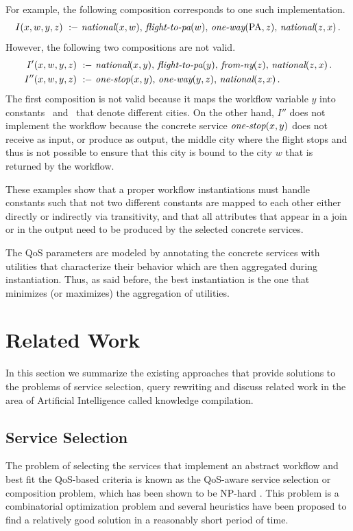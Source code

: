 \documentclass{llncs}
\newcommand{\qrule}{:\!\!-}
\newcommand{\national}{\text{\it national}}
\newcommand{\oneway}{\text{\it one-way}}
\newcommand{\onestop}{\text{\it one-stop}}
\newcommand{\flightPA}{\text{\it flight-to-pa}}
\newcommand{\fromNY}{\text{\it from-ny}}
\newcommand{\PA}{\text{PA}}
\newcommand{\NY}{\text{NY}}
\begin{document}
For example, the following composition corresponds to one such implementation.
\[ I(x,w,y,z)\ \qrule\ \national(x,w),\,\flightPA(w),\,\oneway(\PA,z),\,\national(z,x)\,. \]
However, the following two compositions are not valid.
\begin{alignat*}{1}
I'(x,w,y,z)\  \qrule\ &\national(x,y),\,\flightPA(y),\,\fromNY(z),\,\national(z,x)\,. \\
I''(x,w,y,z)\ \qrule\ &\onestop(x,y),\,\oneway(y,z),\,\national(z,x)\,.
\end{alignat*}
The first composition is not valid because it maps the workflow variable $y$
into constants \PA\ and \NY\ that denote different cities.
On the other hand, $I''$ does not implement the workflow because the concrete
service $\onestop(x,y)$ does not receive as input, or produce as output, the
middle city where the flight stops and thus is not possible to ensure that 
this city is bound to the city $w$ that is returned by the workflow.

These examples show that a proper workflow instantiations must handle
constants such that not two different constants are mapped to each
other either directly or indirectly via transitivity, and that all
attributes that appear in a join or in the output need to be produced
by the selected concrete services.

The QoS parameters are modeled by annotating the concrete services with
utilities that characterize their behavior which are then aggregated
during instantiation. Thus, as said before, the best instantiation is
the one that minimizes (or maximizes) the aggregation of utilities.

\section{Related Work}

In this section we summarize the existing approaches that provide
solutions to the problems of service selection, query rewriting and
discuss related work in the area of Artificial Intelligence called
knowledge compilation.

\subsection{Service Selection}

The problem of selecting the services that implement an abstract workflow
and best fit the QoS-based criteria is known as the QoS-aware service
selection or composition problem, which has been shown to be NP-hard \cite{Hiroshi2008}.
This problem is a combinatorial optimization problem and several heuristics 
have been proposed to find a relatively good solution in a reasonably short
period of time.
\end{document}
